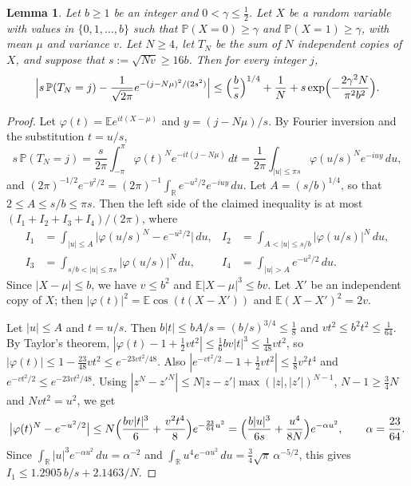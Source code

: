 \documentclass[11pt]{amsart}
\newtheorem{lemma}[theorem]{Lemma}
\numberwithin{equation}{section}
\newcommand{\Pp}{\mathbb P}
\newcommand{\E}{\mathbb E}
\newcommand{\R}{\mathbb R}
\begin{document}
\begin{lemma}\label{lem:llt}
Let $b\ge1$ be an integer and $0<\gamma\le\frac12$. Let $X$ be a random variable with values in $\{0,1,\dots,b\}$ such that $\Pp(X=0)\ge\gamma$ and $\Pp(X=1)\ge\gamma$, with mean $\mu$ and variance $v$. Let $N\ge4$, let $T_N$ be the sum of $N$ independent copies of $X$, and suppose that $s:=\sqrt{Nv}\ge16b$. Then for every integer $j$,
\[
\Bigl|s\,\Pp(T_N=j)-\frac{1}{\sqrt{2\pi}}e^{-(j-N\mu)^2/(2s^2)}\Bigr|\le\Bigl(\frac bs\Bigr)^{1/4}+\frac1N+s\exp\Bigl(-\frac{2\gamma^2N}{\pi^2b^2}\Bigr).
\]
\end{lemma}

\begin{proof}
Let $\varphi(t)=\E e^{it(X-\mu)}$ and $y=(j-N\mu)/s$. By Fourier inversion and the substitution $t=u/s$,
\[
s\,\Pp(T_N=j)=\frac{s}{2\pi}\int_{-\pi}^{\pi}\varphi(t)^Ne^{-it(j-N\mu)}\,dt=\frac1{2\pi}\int_{|u|\le\pi s}\varphi(u/s)^Ne^{-iuy}\,du,
\]
and $(2\pi)^{-1/2}e^{-y^2/2}=(2\pi)^{-1}\int_{\R}e^{-u^2/2}e^{-iuy}\,du$. Let $A=(s/b)^{1/4}$, so that $2\le A\le s/b\le\pi s$. Then the left side of the claimed inequality is at most $(I_1+I_2+I_3+I_4)/(2\pi)$, where
\begin{align*}
I_1&=\int_{|u|\le A}\bigl|\varphi(u/s)^N-e^{-u^2/2}\bigr|\,du, & I_2&=\int_{A<|u|\le s/b}|\varphi(u/s)|^N\,du,\\
I_3&=\int_{s/b<|u|\le\pi s}|\varphi(u/s)|^N\,du, & I_4&=\int_{|u|>A}e^{-u^2/2}\,du.
\end{align*}
Since $|X-\mu|\le b$, we have $v\le b^2$ and $\E|X-\mu|^3\le bv$. Let $X'$ be an independent copy of $X$; then $|\varphi(t)|^2=\E\cos(t(X-X'))$ and $\E(X-X')^2=2v$.

Let $|u|\le A$ and $t=u/s$. Then $b|t|\le bA/s=(b/s)^{3/4}\le\frac18$ and $vt^2\le b^2t^2\le\frac1{64}$. By Taylor's theorem, $|\varphi(t)-1+\frac12vt^2|\le\frac16bv|t|^3\le\frac1{48}vt^2$, so $|\varphi(t)|\le1-\frac{23}{48}vt^2\le e^{-23vt^2/48}$. Also $|e^{-vt^2/2}-1+\frac12vt^2|\le\frac18v^2t^4$ and $e^{-vt^2/2}\le e^{-23vt^2/48}$. Using $|z^N-z'^N|\le N|z-z'|\max(|z|,|z'|)^{N-1}$, $N-1\ge\frac34N$ and $Nvt^2=u^2$, we get
\[
\bigl|\varphi(t)^N-e^{-u^2/2}\bigr|\le N\Bigl(\frac{bv|t|^3}6+\frac{v^2t^4}8\Bigr)e^{-\frac{23}{64}u^2}=\Bigl(\frac{b|u|^3}{6s}+\frac{u^4}{8N}\Bigr)e^{-\alpha u^2},\qquad\alpha=\frac{23}{64}.
\]
Since $\int_{\R}|u|^3e^{-\alpha u^2}\,du=\alpha^{-2}$ and $\int_{\R}u^4e^{-\alpha u^2}\,du=\frac34\sqrt\pi\,\alpha^{-5/2}$, this gives $I_1\le1.2905\,b/s+2.1463/N$.


\end{proof}
\end{document}
